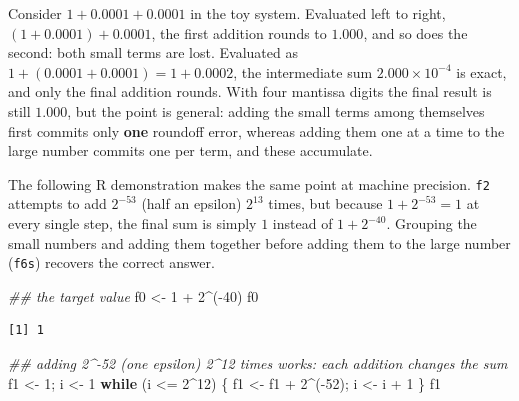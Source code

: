\documentclass[
  letterpaper,
  DIV=11,
  numbers=noendperiod]{scrreprt}
\newenvironment{Shaded}{\begin{snugshade}}{\end{snugshade}}
\newcommand{\ControlFlowTok}[1]{\textcolor[rgb]{0.00,0.23,0.31}{\textbf{#1}}}
\newcommand{\DecValTok}[1]{\textcolor[rgb]{0.68,0.00,0.00}{#1}}
\newcommand{\DocumentationTok}[1]{\textcolor[rgb]{0.37,0.37,0.37}{\textit{#1}}}
\newcommand{\NormalTok}[1]{\textcolor[rgb]{0.00,0.23,0.31}{#1}}
\newcommand{\OtherTok}[1]{\textcolor[rgb]{0.00,0.23,0.31}{#1}}
\newcommand{\SpecialCharTok}[1]{\textcolor[rgb]{0.37,0.37,0.37}{#1}}
\begin{document}
Consider \(1 + 0.0001 + 0.0001\) in the toy system. Evaluated left to
right, \((1 + 0.0001) + 0.0001\), the first addition rounds to
\(1.000\), and so does the second: both small terms are lost. Evaluated
as \(1 + (0.0001 + 0.0001) = 1 + 0.0002\), the intermediate sum
\(2.000\times10^{-4}\) is exact, and only the final addition rounds.
With four mantissa digits the final result is still \(1.000\), but the
point is general: adding the small terms among themselves first commits
only \textbf{one} roundoff error, whereas adding them one at a time to
the large number commits one per term, and these accumulate.

The following R demonstration makes the same point at machine precision.
\texttt{f2} attempts to add \(2^{-53}\) (half an epsilon) \(2^{13}\)
times, but because \(1 + 2^{-53} = 1\) at every single step, the final
sum is simply \(1\) instead of \(1 + 2^{-40}\). Grouping the small
numbers and adding them together before adding them to the large number
(\texttt{f6s}) recovers the correct answer.

\begin{Shaded}
\begin{Highlighting}[]
\DocumentationTok{\#\# the target value}
\NormalTok{f0 }\OtherTok{\textless{}{-}} \DecValTok{1} \SpecialCharTok{+} \DecValTok{2}\SpecialCharTok{\^{}}\NormalTok{(}\SpecialCharTok{{-}}\DecValTok{40}\NormalTok{)}
\NormalTok{f0}
\end{Highlighting}
\end{Shaded}

\begin{verbatim}
[1] 1
\end{verbatim}

\begin{Shaded}
\begin{Highlighting}[]
\DocumentationTok{\#\# adding 2\^{}{-}52 (one epsilon) 2\^{}12 times works: each addition changes the sum}
\NormalTok{f1 }\OtherTok{\textless{}{-}} \DecValTok{1}\NormalTok{; i }\OtherTok{\textless{}{-}} \DecValTok{1}
\ControlFlowTok{while}\NormalTok{ (i }\SpecialCharTok{\textless{}=} \DecValTok{2}\SpecialCharTok{\^{}}\DecValTok{12}\NormalTok{) \{ f1 }\OtherTok{\textless{}{-}}\NormalTok{ f1 }\SpecialCharTok{+} \DecValTok{2}\SpecialCharTok{\^{}}\NormalTok{(}\SpecialCharTok{{-}}\DecValTok{52}\NormalTok{); i }\OtherTok{\textless{}{-}}\NormalTok{ i }\SpecialCharTok{+} \DecValTok{1}\NormalTok{ \}}
\NormalTok{f1}
\end{Highlighting}
\end{Shaded}
\end{document}
